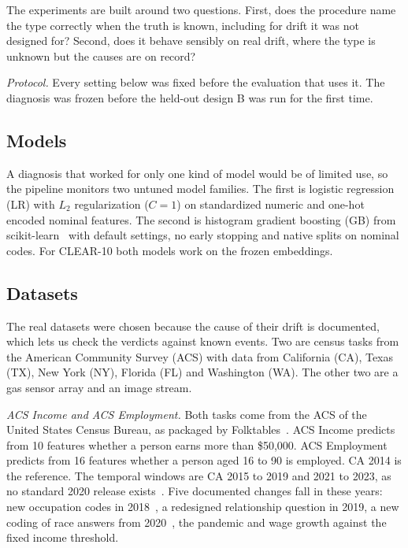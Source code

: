 \documentclass[pdflatex,sn-mathphys-num]{sn-jnl}
\begin{document}
The experiments are built around two questions. First, does the procedure name the type correctly when the truth is known, including for drift it was not designed for? Second, does it behave sensibly on real drift, where the type is unknown but the causes are on record?

\emph{Protocol.} Every setting below was fixed before the evaluation that uses it. The diagnosis was frozen before the held-out design B was run for the first time.

\subsection{Models}

A diagnosis that worked for only one kind of model would be of limited use, so the pipeline monitors two untuned model families. The first is logistic regression (LR) with $L_2$ regularization ($C=1$) on standardized numeric and one-hot encoded nominal features. The second is histogram gradient boosting (GB) from scikit-learn~\cite{pedregosa2011scikit} with default settings, no early stopping and native splits on nominal codes. For CLEAR-10 both models work on the frozen embeddings.

\subsection{Datasets}\label{sec:datasets}

The real datasets were chosen because the cause of their drift is documented, which lets us check the verdicts against known events. Two are census tasks from the American Community Survey (ACS) with data from California (CA), Texas (TX), New York (NY), Florida (FL) and Washington (WA). The other two are a gas sensor array and an image stream.

\emph{ACS Income and ACS Employment.} Both tasks come from the ACS of the United States Census Bureau, as packaged by Folktables~\cite{ding2021retiring}. ACS Income predicts from 10 features whether a person earns more than \$50,000. ACS Employment predicts from 16 features whether a person aged 16 to 90 is employed. CA 2014 is the reference. The temporal windows are CA 2015 to 2019 and 2021 to 2023, as no standard 2020 release exists~\cite{census2021experimental}. Five documented changes fall in these years: new occupation codes in 2018~\cite{census2020occupation}, a redesigned relationship question in 2019, a new coding of race answers from 2020~\cite{census2021race}, the pandemic and wage growth against the fixed income threshold.
\end{document}
